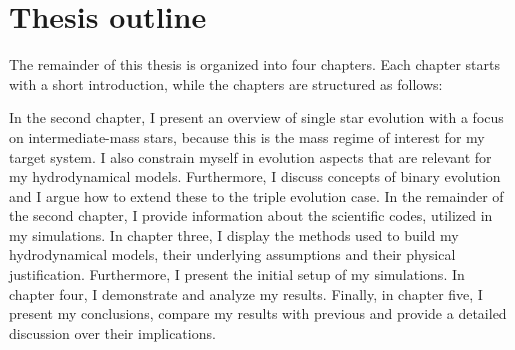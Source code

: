 \section{Thesis outline}

The remainder of this thesis is organized into four chapters. Each chapter starts with a short introduction, while the chapters are structured as follows: 

In the second chapter, I present an overview of single star evolution with a focus on intermediate-mass stars, because this is the mass regime of interest for my target system. I also constrain myself in evolution aspects that are relevant for my hydrodynamical models. Furthermore, I discuss concepts of binary evolution and I argue how to extend these to the triple evolution case. In the remainder of the second chapter, I provide information about the scientific codes, utilized in my simulations. In chapter three, I display the methods used to build my hydrodynamical models, their underlying assumptions and their physical justification. Furthermore, I present the initial setup of my simulations. In chapter four, I demonstrate and analyze my results. Finally, in chapter five, I present my conclusions, compare my results with previous and provide a detailed discussion over their implications.


